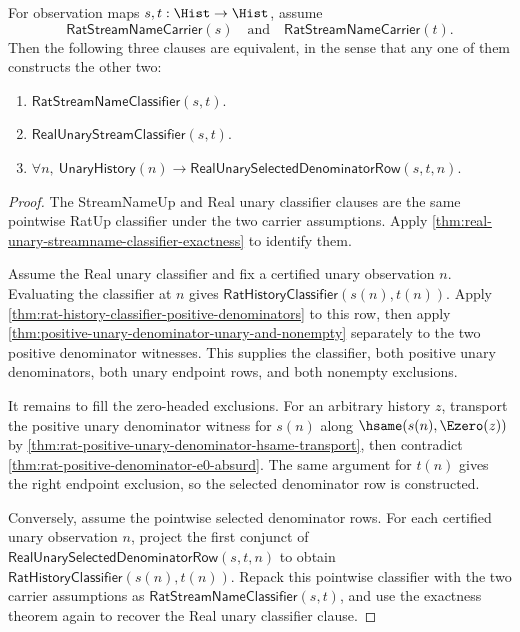 \begin{theorem}
\label{thm:real-unary-streamname-pointwise-denominator-coverage}
For observation maps $s,t:\Hist\to\Hist$, assume
$$
\mathsf{RatStreamNameCarrier}(s)
\quad\text{and}\quad
\mathsf{RatStreamNameCarrier}(t).
$$
Then the following three clauses are equivalent, in the sense that any one of
them constructs the other two:
\begin{enumerate}
\item $\mathsf{RatStreamNameClassifier}(s,t)$.
\item $\mathsf{RealUnaryStreamClassifier}(s,t)$.
\item $\forall n,\ \mathsf{UnaryHistory}(n)\to
\mathsf{RealUnarySelectedDenominatorRow}(s,t,n)$.
\end{enumerate}
\end{theorem}
\begin{proof}
The StreamNameUp and Real unary classifier clauses are the same pointwise
RatUp classifier under the two carrier assumptions. Apply
\autoref{thm:real-unary-streamname-classifier-exactness} to identify them.

Assume the Real unary classifier and fix a certified unary observation $n$.
Evaluating the classifier at $n$ gives
$\mathsf{RatHistoryClassifier}(s(n),t(n))$. Apply
\autoref{thm:rat-history-classifier-positive-denominators} to this row, then
apply \autoref{thm:positive-unary-denominator-unary-and-nonempty} separately
to the two positive denominator witnesses. This supplies the classifier, both
positive unary denominators, both unary endpoint rows, and both nonempty
exclusions.

It remains to fill the zero-headed exclusions. For an arbitrary history $z$,
transport the positive unary denominator witness for $s(n)$ along
$\hsame(s(n),\Ezero(z))$ by
\autoref{thm:rat-positive-unary-denominator-hsame-transport}, then contradict
\autoref{thm:rat-positive-denominator-e0-absurd}. The same argument for
$t(n)$ gives the right endpoint exclusion, so the selected denominator row is
constructed.

Conversely, assume the pointwise selected denominator rows. For each certified
unary observation $n$, project the first conjunct of
$\mathsf{RealUnarySelectedDenominatorRow}(s,t,n)$ to obtain
$\mathsf{RatHistoryClassifier}(s(n),t(n))$. Repack this pointwise classifier
with the two carrier assumptions as $\mathsf{RatStreamNameClassifier}(s,t)$,
and use the exactness theorem again to recover the Real unary classifier
clause.
\end{proof}

